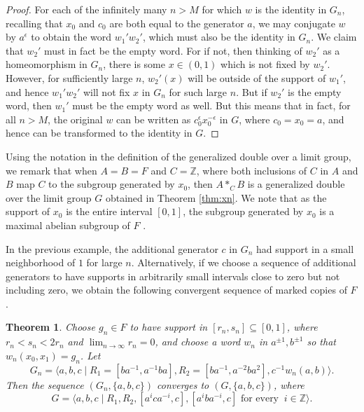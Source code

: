 \documentclass[11pt]{amsart}
\newtheorem{theorem}{Theorem}[section]
\begin{document}
\begin{proof}
For each of the infinitely many $n>M$ for which $w$ is the
identity in $G_n$, recalling that $x_0$ and $c_0$ are both equal
to the generator $a$, we may conjugate $w$ by $a^{\epsilon}$ to
obtain the word $w_1'w_2'$, which must also be the identity in $G_n$.
We claim that $w_2'$ must in fact be the empty word. For if not,
then thinking of $w_2'$ as a homeomorphism in $G_n$, there is some
$x \in (0,1)$ which  is not fixed by $w_2'$. However, for
sufficiently large $n$, $w_2'(x)$ will be outside of the support
of $w_1'$, and hence $w_1' w_2'$ will not fix $x$ in $G_n$ for
such large $n$. But if $w_2'$ is the empty word, then $w_1'$ must
be the empty word as well. But this means that in fact, for all
$n>M$, the original $w$ can be written as
$c_0^{\epsilon}x_0^{-\epsilon}$ in $G$, where $c_0=x_0=a$, and hence can be
transformed to the identity in $G$.
\end{proof}

Using the notation in the definition of the generalized double over a limit group, we remark that when
$A = B = F$ and $C = {\mathbb Z}$, where both inclusions of $C$ in $A$ and $B$ map $C$ to the subgroup generated by $x_0$,
then $A *_C B$ is a generalized double over the limit group $G$ obtained in Theorem \ref{thm:xn}.  We note that as the support of $x_0$
is the entire interval $[0,1]$, the subgroup generated by $x_0$ is a maximal abelian subgroup of $F$ \cite{BS2}.

In the previous example, the additional generator $c$ in $G_n$ had support
in a small neighborhood of $1$ for large $n$. Alternatively, if
we choose a sequence of additional generators to have supports in arbitrarily
small intervals close to zero but not including zero, we obtain
the following convergent sequence of marked copies of $F$.

\begin{theorem}\label{thm:jens-example}
Choose $g_n \in F$ to have support in $[r_n,s_n]\subseteq [0,1]$,
where $r_n < s_n < 2r_n$ and $\lim_{n \rightarrow \infty} r_n
=0$, and choose a word $w_n$ in $a^{\pm1},b^{\pm1}$ so that
$w_n(x_0,x_1)=g_n$. Let $$G_n=\langle a, b, c \mid R_1=[ba^{-1},
a^{-1}ba], R_2=[ba^{-1}, a^{-2}ba^2], c^{-1}w_n(a,b) \rangle.$$
Then the sequence $(G_n, \{a,b,c\})$ converges to $(G,
\{a,b,c\})$, where $$G= \langle a,b,c \mid R_1, R_2,
[a^ica^{-i},c], [a^i b a^{-i},c ] \text{ for every } ~i \in
{\mathbb Z}\rangle.$$
\end{theorem}
\end{document}
